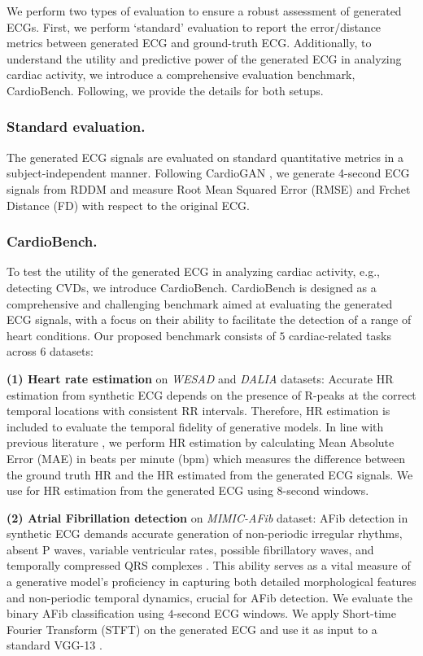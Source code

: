 \documentclass[letterpaper]{article} %
\begin{document}
We perform two types of evaluation to ensure a robust assessment of generated ECGs. First, we perform `standard' evaluation to report the error/distance metrics between generated ECG and ground-truth ECG. Additionally, to understand the utility and predictive power of the generated ECG in analyzing cardiac activity, we introduce a comprehensive evaluation benchmark, CardioBench. Following, we provide the details for both setups.

\noindent \subsubsection{Standard evaluation.}
The generated ECG signals are evaluated on standard quantitative metrics in a subject-independent manner. Following CardioGAN \cite{sarkar2021cardiogan}, we generate 4-second ECG signals from RDDM and measure Root Mean Squared Error (RMSE) and Frchet Distance (FD) with respect to the original ECG.

\subsubsection{CardioBench.}
To test the utility of the generated ECG in analyzing cardiac activity, e.g., detecting CVDs, we introduce CardioBench. CardioBench is designed as a comprehensive and challenging benchmark aimed at evaluating the generated ECG signals, with a focus on their ability to facilitate the detection of a range of heart conditions. Our proposed benchmark consists of $5$ cardiac-related tasks across $6$ datasets: 

    \textbf{(1) Heart rate estimation} on \textit{WESAD} \cite{schmidt2018introducing} and \textit{DALIA} \cite{reiss2019deep} datasets: Accurate HR estimation from synthetic ECG depends on the presence of R-peaks at the correct temporal locations with consistent RR intervals. Therefore, HR estimation is included to evaluate the temporal fidelity of generative models. In line with previous literature \cite{sarkar2021cardiogan}, we perform HR estimation by calculating Mean Absolute Error (MAE) in beats per minute (bpm) which measures the difference between the ground truth HR and the HR estimated from the generated ECG signals. We use \cite{hamilton2002open} for HR estimation from the generated ECG using $8$-second windows.
    
    \textbf{(2) Atrial Fibrillation detection} on \textit{MIMIC-AFib} \cite{bashar2019noise} dataset: 
    AFib detection in synthetic ECG demands accurate generation of non-periodic irregular rhythms, absent P waves, variable ventricular rates, possible fibrillatory waves, and temporally compressed QRS complexes \cite{burnsguidelines}. This ability serves as a vital measure of a generative model's proficiency in capturing both detailed morphological features and non-periodic temporal dynamics, crucial for AFib detection. We evaluate the binary AFib classification using $4$-second ECG windows. We apply  Short-time Fourier Transform (STFT) on the generated ECG and use it as input to a standard VGG-13 \cite{sallem2020detection}. 
    
\end{document}
